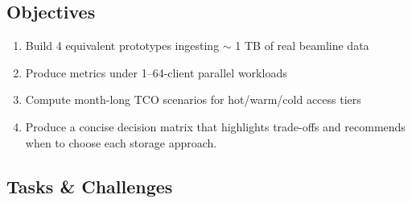 \documentclass{article}
\begin{document}
\subsection{Objectives}
\begin{enumerate}
    \item Build 4 equivalent prototypes ingesting $\sim$ 1 TB of real beamline data
    \item Produce metrics under 1–64-client parallel workloads
    \item Compute month-long TCO scenarios for hot/warm/cold access tiers
    \item Produce a concise decision matrix that highlights trade-offs and recommends when to choose each storage approach.
\end{enumerate}

\subsection{Tasks \& Challenges}
\end{document}
